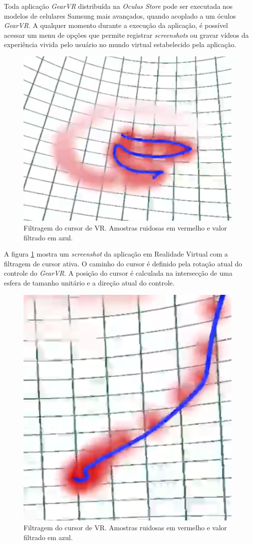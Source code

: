 \documentclass[conference]{IEEEtran}
\begin{document}
Toda aplicação \textit{GearVR} distribuída na \textit{Oculus Store} \cite{gearvrstore} pode ser executada nos modelos de celulares Samsung mais avançados, quando acoplado a um óculos \textit{GearVR}. A qualquer momento durante a execução da aplicação, é possível acessar um menu de opções que permite registrar \textit{screenshots} ou gravar vídeos da experiência vivida pelo usuário no mundo virtual estabelecido pela aplicação.

\begin{figure}[ht]
\centering
\includegraphics[width=.5\textwidth]{images/image_01.png}
\caption{Filtragem do cursor de VR. Amostras ruidosas em vermelho e valor filtrado em azul.}
\label{fig:filter01}
\end{figure}

A figura \ref{fig:filter01} mostra um \textit{screenshot} da aplicação em Realidade Virtual com a filtragem de cursor ativa. O caminho do cursor é definido pela rotação atual do controle do \textit{GearVR}. A posição do cursor é calculada na intersecção de uma esfera de tamanho unitário e a direção atual do controle.

\begin{figure}[ht]
\centering
\includegraphics[width=.5\textwidth]{images/image_02.png}
\caption{Filtragem do cursor de VR. Amostras ruidosas em vermelho e valor filtrado em azul.}
\label{fig:filter02}
\end{figure}
\end{document}
